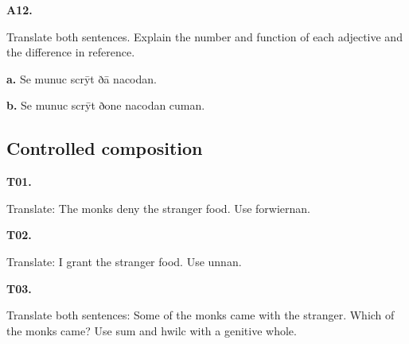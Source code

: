 \par\begin{minipage}{\linewidth}\raggedright
\textbf{A12.}

Translate both sentences. Explain the number and function of each adjective and the difference in reference.

\textbf{a.} Se munuc scrȳt ðā nacodan.

\textbf{b.} Se munuc scrȳt ðone nacodan cuman.

\end{minipage}\par\addvspace{4pt}

\subsection*{Controlled composition}

\par\begin{minipage}{\linewidth}\raggedright
\textbf{T01.}

Translate: The monks deny the stranger food. Use forwiernan.

\end{minipage}\par\addvspace{4pt}

\par\begin{minipage}{\linewidth}\raggedright
\textbf{T02.}

Translate: I grant the stranger food. Use unnan.

\end{minipage}\par\addvspace{4pt}

\par\begin{minipage}{\linewidth}\raggedright
\textbf{T03.}

Translate both sentences: Some of the monks came with the stranger. Which of the monks came? Use sum and hwilc with a genitive whole.

\end{minipage}\par\addvspace{4pt}

